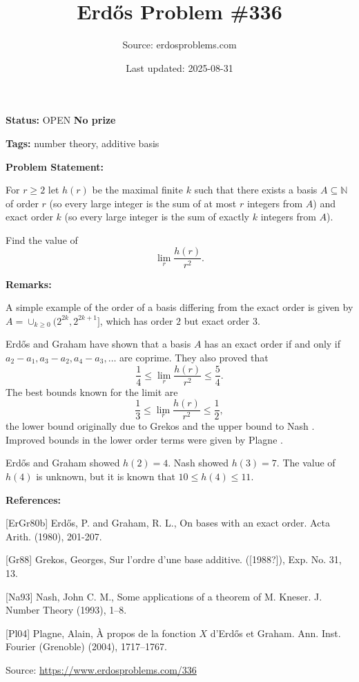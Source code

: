 \documentclass{article}
\title{Erd\H{o}s Problem \#336}
\date{Last updated: 2025-08-31}
\author{Source: erdosproblems.com}
\begin{document}
\maketitle

\noindent\textbf{Status:} OPEN \quad \textbf{No prize}

\noindent\textbf{Tags:} number theory, additive basis

\medskip
\noindent\textbf{Problem Statement:}

For $r\geq 2$ let $h(r)$ be the maximal finite $k$ such that there exists a basis $A\subseteq \mathbb{N}$ of order $r$ (so every large integer is the sum of at most $r$ integers from $A$) and exact order $k$ (so every large integer is the sum of exactly $k$ integers from $A$). 

Find the value of\[\lim_r \frac{h(r)}{r^2}.\]

\bigskip
\noindent\textbf{Remarks:}

A simple example of the order of a basis differing from the exact order is given by $A=\cup_{k\geq 0}(2^{2k},2^{2k+1}]$, which has order $2$ but exact order $3$.

Erd\H{o}s and Graham \cite{ErGr80b} have shown that a basis $A$ has an exact order if and only if $a_2-a_1,a_3-a_2,a_4-a_3,\ldots$ are coprime. They also proved that\[\frac{1}{4}\leq \lim_r \frac{h(r)}{r^2}\leq \frac{5}{4}.\]The best bounds known for the limit are\[\frac{1}{3}\leq \lim_r \frac{h(r)}{r^2}\leq \frac{1}{2},\]the lower bound originally due to Grekos \cite{Gr88} and the upper bound to Nash \cite{Na93}. Improved bounds in the lower order terms were given by Plagne \cite{Pl04}.

Erd\H{o}s and Graham \cite{ErGr80b} showed $h(2)=4$. Nash \cite{Na93} showed $h(3)=7$. The value of $h(4)$ is unknown, but it is known \cite{Pl04} that $10\leq h(4)\leq 11$.

\bigskip
\noindent\textbf{References:}

[ErGr80b] Erd\H{o}s, P. and Graham, R. L., On bases with an exact order. Acta Arith. (1980), 201-207.
 
 [Gr88] Grekos, Georges, Sur l'ordre d'une base additive. ([1988?]), Exp. No. 31, 13.
 
 [Na93] Nash, John C. M., Some applications of a theorem of {M}. {K}neser. J. Number Theory (1993), 1--8.
 
 [Pl04] Plagne, Alain, \`A{} propos de la fonction {$X$} d'{E}rd\H{o}s et {G}raham. Ann. Inst. Fourier (Grenoble) (2004), 1717--1767.

\bigskip
\noindent\small{Source: \url{https://www.erdosproblems.com/336}}
\end{document}
